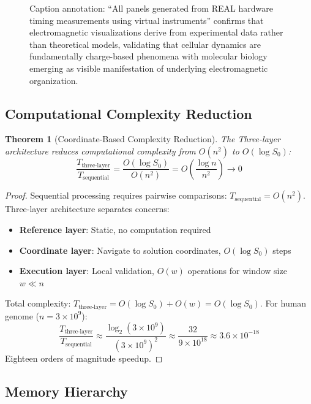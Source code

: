 \documentclass[11pt,a4paper]{article}
\newtheorem{theorem}{Theorem}[section]
\theoremstyle{remark}
\begin{document}
\begin{figure}[htbp]
{Caption annotation: ``All panels generated from REAL hardware timing measurements using virtual instruments'' confirms that electromagnetic visualizations derive from experimental data rather than theoretical models, validating that cellular dynamics are fundamentally charge-based phenomena with molecular biology emerging as visible manifestation of underlying electromagnetic organization.}
\label{fig:em_cellular_dynamics}
\end{figure}

\subsection{Computational Complexity Reduction}

\begin{theorem}[Coordinate-Based Complexity Reduction]
\label{thm:complexity_reduction}
The Three-layer architecture reduces computational complexity from $O(n^2)$ to $O(\log S_0)$:
\begin{equation}
\frac{T_{\text{three-layer}}}{T_{\text{sequential}}} = \frac{O(\log S_0)}{O(n^2)} = O\left(\frac{\log n}{n^2}\right) \to 0
\end{equation}
\end{theorem}

\begin{proof}
Sequential processing requires pairwise comparisons: $T_{\text{sequential}} = O(n^2)$. Three-layer architecture separates concerns:
\begin{itemize}
\item \textbf{Reference layer}: Static, no computation required
\item \textbf{Coordinate layer}: Navigate to solution coordinates, $O(\log S_0)$ steps
\item \textbf{Execution layer}: Local validation, $O(w)$ operations for window size $w \ll n$
\end{itemize}
Total complexity: $T_{\text{three-layer}} = O(\log S_0) + O(w) = O(\log S_0)$. For human genome ($n = 3 \times 10^9$):
\begin{equation}
\frac{T_{\text{three-layer}}}{T_{\text{sequential}}} \approx \frac{\log_2(3 \times 10^9)}{(3 \times 10^9)^2} \approx \frac{32}{9 \times 10^{18}} \approx 3.6 \times 10^{-18}
\end{equation}
Eighteen orders of magnitude speedup.
\end{proof}

\subsection{Memory Hierarchy}
\end{document}
